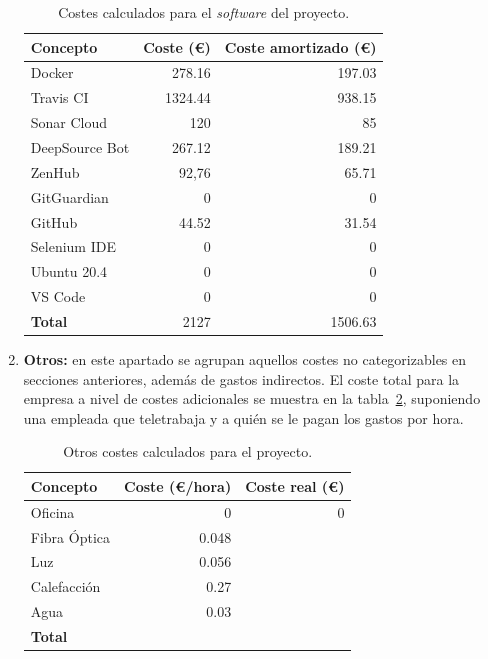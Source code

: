 \begin{enumerate}
\begin{table}[p]
	\centering
	\begin{tabular}{l r r}
		\toprule
		\textbf{Concepto} & \textbf{Coste (€)} & \textbf{Coste amortizado (€)} \\
		\midrule
		Docker & 278.16 & 197.03 \\
		Travis CI & 1324.44 & 938.15\\
		Sonar Cloud  & 120 & 85\\
		DeepSource Bot  & 267.12 & 189.21\\
		ZenHub  & 92,76 & 65.71\\
		GitGuardian  & 0 & 0\\
		GitHub  & 44.52 & 31.54\\
		Selenium IDE & 0 & 0\\
		Ubuntu 20.4  & 0 & 0\\
		VS Code  & 0 & 0\\
		\midrule
		\textbf{Total} & 2127 & 1506.63 \\
		\bottomrule
	\end{tabular}
	\caption[Costes: \textit{software}]{Costes calculados para el \textit{software} del proyecto.}
	\label{a:costes-software}
\end{table}


\item\textbf{Otros:} en este apartado se agrupan aquellos costes no categorizables en secciones anteriores, además de gastos indirectos. El coste total para la empresa a nivel de costes adicionales se muestra en la tabla~\ref{a:costes-otros}, suponiendo una empleada que teletrabaja y a quién se le pagan los gastos por hora.

\begin{table}[p]
	\centering
	\begin{tabular}{l r r}
		\toprule
		\textbf{Concepto} & \textbf{Coste (€/hora)} & \textbf{Coste real (€)} \\
		\midrule
		Oficina & 0 & 0\\
		Fibra Óptica & 0.048 & \\
		Luz & 0.056 & \\
		Calefacción & 0.27 & \\
		Agua & 0.03 & \\
		\midrule
		\textbf{Total} & & \\
		\bottomrule
	\end{tabular}
	\caption[Costes: otros]{Otros costes calculados para el proyecto.}
	\label{a:costes-otros}
\end{table}



\end{enumerate}
